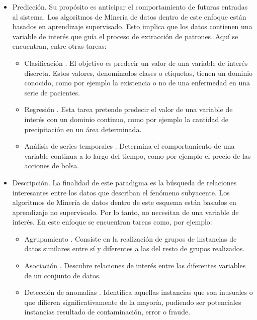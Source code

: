 \documentclass[c5paper,10pt,twoside]{book}	   	%
\begin{document}
\begin{itemize}
	\item Predicción. Su propósito es anticipar el comportamiento de futuras entradas al sistema. Los algoritmos de Minería de datos dentro de este enfoque están basados en aprendizaje supervisado. Esto implica que los datos contienen una variable de interés que guía el proceso de extracción de patrones. Aquí se encuentran, entre otras tareas: 
	
	\begin{itemize}
		\item Clasificación \cite{Cm07}. El objetivo es predecir un valor de una variable de interés discreta. Estos valores, denominados clases o etiquetas, tienen un dominio conocido, como por ejemplo la existencia o no de una enfermedad en una serie de pacientes.
		
		\item Regresión \cite{Cm07}. Esta tarea pretende predecir el valor de una variable de interés con un dominio continuo, como por ejemplo la cantidad de precipitación en un área determinada.
		
		\item Análisis de series temporales \cite{Bjr08}. Determina el comportamiento de una variable continua a lo largo del tiempo, como por ejemplo el precio de las acciones de bolsa.
	\end{itemize}

	\item Descripción. La finalidad de este paradigma es la búsqueda de relaciones interesantes entre los datos que describan el fenómeno subyacente. Los algoritmos de Minería de datos dentro de este esquema están basados en aprendizaje no supervisado. Por lo tanto, no necesitan de una variable de interés. En este enfoque se encuentran tareas como, por ejemplo:
	
	\begin{itemize}
		\item Agrupamiento \cite{McQ67}. Consiste en la realización de grupos de instancias de datos similares entre sí y diferentes a las del resto de grupos realizados.
		
		\item Asociación \cite{Ais93}. Descubre relaciones de interés entre las diferentes variables de un conjunto de datos. 
		
		\item Detección de anomalías \cite{Hawkings98}. Identifica aquellas instancias que son inusuales o que difieren significativamente de la mayoría, pudiendo ser potenciales instancias resultado de contaminación, error o fraude.
	\end{itemize}
\end{itemize}
\end{document}
